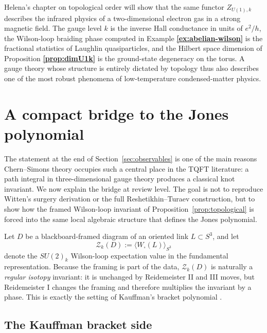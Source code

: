 \documentclass[11pt]{article}
\theoremstyle{definition}
\numberwithin{theorem}{section}
\numberwithin{equation}{section}
\begin{document}
\medskip

\noindent Helena's chapter on topological order will show that the same functor $Z_{U(1),k}$ describes the infrared physics of a two-dimensional electron gas in a strong magnetic field. The gauge level $k$ is the inverse Hall conductance in units of $e^2/h$, the Wilson-loop braiding phase computed in Example \textbf{\ref{ex:abelian-wilson}} is the fractional statistics of Laughlin quasiparticles, and the Hilbert space dimension of Proposition \textbf{\ref{prop:dimU1k}} is the ground-state degeneracy on the torus. A gauge theory whose structure is entirely dictated by topology thus also describes one of the most robust phenomena of low-temperature condensed-matter physics.

\section{A compact bridge to the Jones polynomial}\label{sec:witten-jones}

The statement at the end of Section~\ref{sec:observables} is one of the main reasons Chern--Simons theory occupies such a central place in the TQFT literature: a path integral in three-dimensional gauge theory produces a classical knot invariant. We now explain the bridge at review level. The goal is not to reproduce Witten's surgery derivation or the full Reshetikhin--Turaev construction, but to show how the framed Wilson-loop invariant of Proposition~\ref{prop:topological} is forced into the same local algebraic structure that defines the Jones polynomial.

\medskip

\noindent Let $D$ be a blackboard-framed diagram of an oriented link $L \subset S^3$, and let
\begin{equation}\label{eq:Zk-diagram}
\mathcal{Z}_k(D)
:=
\bigl\langle W_{\square}(L)\bigr\rangle_{S^3}
\end{equation}
denote the $SU(2)_k$ Wilson-loop expectation value in the fundamental representation. Because the framing is part of the data, $\mathcal{Z}_k(D)$ is naturally a \emph{regular isotopy} invariant: it is unchanged by Reidemeister II and III moves, but Reidemeister I changes the framing and therefore multiplies the invariant by a phase. This is exactly the setting of Kauffman's bracket polynomial \cite{Kauffman1987}.

\subsection{The Kauffman bracket side}
\end{document}
